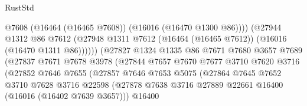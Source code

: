 \begin{lexlean}{RustStd}
\begin{coremodule}
                                          @7608
                                          (@16464 (@16465 @7608))
                                          (@16016 (@16470 @1300 @86))))
                                      (@27944
                                        @1312
                                        @86
                                        @7612
                                        (@27948
                                          @1311
                                          @7612
                                          (@16464 (@16465 @7612))
                                          (@16016 (@16470 @1311 @86))))))
                                  (@27827
                                    @1324
                                    @1335
                                    @86
                                    @7671
                                    @7680
                                    @3657
                                    @7689
                                    (@27837
                                      @7671
                                      @7678
                                      @3978
                                      (@27844
                                        @7657
                                        @7670
                                        @7677
                                        @3710
                                        @7620
                                        @3716
                                        (@27852
                                          @7646
                                          @7655
                                          (@27857
                                            @7646
                                            @7653
                                            @5075
                                            (@27864
                                              @7645
                                              @7652
                                              @3710
                                              @7628
                                              @3716
                                              @22598
                                              (@27878
                                                @7638
                                                @3716
                                                @27889
                                                @22661
                                                @16400
                                                (@16016 (@16402 @7639 @3657)))
                                              @16400

\end{coremodule}
\end{lexlean}
